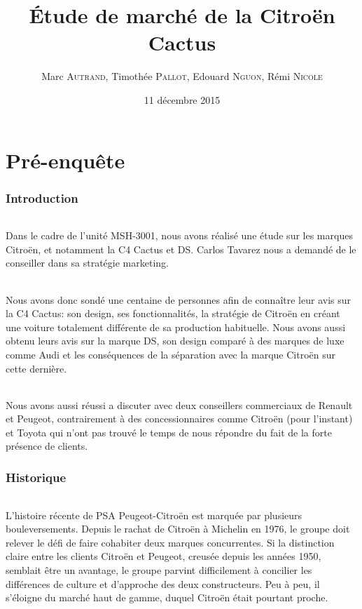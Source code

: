 \documentclass[12pt]{article}\usepackage[]{graphicx}\usepackage[]{color}
\title{Étude de marché de la Citroën Cactus}
\author{Marc \textsc{Autrand}, Timothée \textsc{Pallot}, Edouard
	\textsc{Nguon}, Rémi \textsc{Nicole}}
\date{11 décembre 2015}
\begin{document}
\maketitle

\tableofcontents

\part{Pré-enquête}

\section{Introduction}

\paragraph{} Dans le cadre de l'unité MSH-3001, nous avons réalisé une étude
sur les marques Citroën, et notamment la C4 Cactus et DS. Carlos Tavarez nous a
demandé de le conseiller dans sa stratégie marketing.

\paragraph{} Nous avons donc sondé une centaine de personnes afin de connaître
leur avis sur la C4 Cactus: son design, ses fonctionnalités, la stratégie de
Citroën en créant une voiture totalement différente de sa production
habituelle. Nous avons aussi obtenu leurs avis sur la marque DS, son design
comparé à des marques de luxe comme Audi et les conséquences de la séparation
avec la marque Citroën sur cette dernière.

\paragraph{} Nous avons aussi réussi a discuter avec deux conseillers
commerciaux de Renault et Peugeot, contrairement à des concessionnaires comme
Citroën (pour l'instant) et Toyota qui n'ont pas trouvé le temps de nous
répondre du fait de la forte présence de clients.

\section{Historique}

\paragraph{} L'histoire récente de PSA Peugeot-Citroën est marquée par
plusieurs bouleversements. Depuis le rachat de Citroën à Michelin en 1976, le
groupe doit relever le défi de faire cohabiter deux marques concurrentes. Si la
distinction claire entre les clients Citroën et Peugeot, creusée depuis les
années 1950, semblait être un avantage, le groupe parvint difficilement à
concilier les différences de culture et d'approche des deux constructeurs. Peu
à peu, il s'éloigne du marché haut de gamme, duquel Citroën était pourtant
proche.
\end{document}
